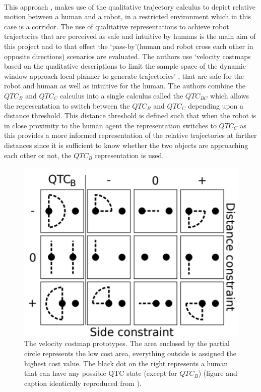 	 \paragraph{}This approach \cite{dondrup2016qualitative}, makes use of the qualitative trajectory calculus to depict relative motion between a human and a robot, in a restricted environment which in this case is a corridor. The use of qualitative representations to achieve robot trajectories that are perceived as safe and intuitive by humans is the main aim of this project and to that effect the `pass-by'(human and robot cross each other in opposite directions) scenarios are evaluated. The authors use `velocity costmaps based on the qualitative descriptions to limit the sample space of the dynamic window approach local planner to generate trajectories' \cite{dondrup2016qualitative}, that are safe for the robot and human as well as intuitive for the human. The authors combine the $QTC_B$ and $QTC_C$ calculus into a single calculus called the $QTC_{BC}$ which allows the representation to switch between the $QTC_B$ and $QTC_C$ depending upon a distance threshold. This distance threshold is defined such that when the robot is in close proximity to the human agent the representation switches to $QTC_C$ as this provides a more informed representation of the relative trajectories at farther distances since it is sufficient to know whether the two objects are approaching each other or not, the $QTC_B$ representation is used. 
	\begin{figure}[h]
		\centering
		\includegraphics[scale = 0.7]{images/qtcbc}
		\caption{The velocity costmap prototypes. The area enclosed by the partial circle represents the low cost area, everything outside is assigned the highest cost value. The black dot on the right represents a human that can have any possible QTC state (except for $QTC_B$) (figure and caption identically reproduced from \cite{dondrup2016qualitative}).}
		\label{fig:qtcbc}
	\end{figure}
	
